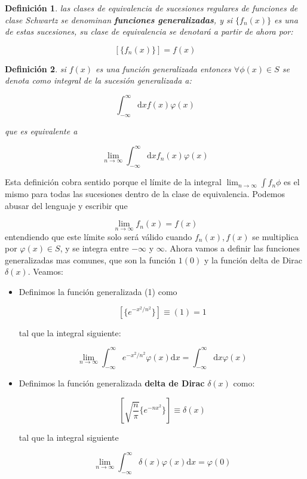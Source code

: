 \documentclass[12pt,a4paper]{book}
\newcommand{\D}{\mathrm{d}}
\newcommand{\inti}{\int_{-\infty}^{\infty}}
\newtheorem{definicion}{Definición}[section]
\begin{document}
\begin{definicion}
las clases de equivalencia de sucesiones regulares de funciones de clase Schwartz se denominan \textbf{funciones generalizadas}, y si $\{ f_n (x) \}$ es una de estas sucesiones, su clase de equivalencia se denotará a partir de ahora por:

$$ \left[ \{ f_n (x) \} \right] = f(x) $$
\end{definicion}

\begin{definicion}
si $f(x)$ es una función generalizada entonces $\forall \phi (x) \in S$ se denota como integral de la sucesión generalizada a:

$$ \inti \D x f(x) \varphi(x)  $$

que es equivalente a 

$$ \lim_{n \rightarrow \infty} \inti \D x f_n(x) \varphi (x) $$
\end{definicion}

Esta definición cobra sentido porque el límite de la integral $\lim_{n \rightarrow \infty} \int f_n \phi$ es el mismo para todas las sucesiones dentro de la clase de equivalencia. Podemos abusar del lenguaje y escribir que

\begin{equation}
\lim_{n \rightarrow \infty} f_n (x) = f(x)
\end{equation}
entendiendo que este límite solo será válido cuando $f_n (x),f(x)$ se multiplica por $\varphi (x) \in S$, y se integra entre $- \infty$ y $\infty$. Ahora vamos a definir las funciones generalizadas mas comunes, que son la función $1(0)$ y la función delta de Dirac $\delta(x)$. Veamos:

\begin{itemize}
\item Definimos la función generalizada (1) como 

$$ [ \{ e^{-x^2/n^2} \} ] \equiv (1) =  1 $$

tal que la integral siguiente:
 
$$ \lim_{n \rightarrow \infty} \inti e^{-x^2 / n^2} \varphi (x) \D x = \inti \D x \varphi (x) $$ 

\item Definimos la función generalizada \textbf{delta de Dirac} $\delta (x)$ como:

$$ [  \sqrt{\dfrac{n}{\pi}} \{ e^{-nx^2} \} ] \equiv \delta (x) $$

tal que la integral siguiente

$$ \lim_{n \rightarrow \infty} \inti \delta(x) \varphi (x) \D x = \varphi (0) $$ 
\end{itemize}
\end{document}

